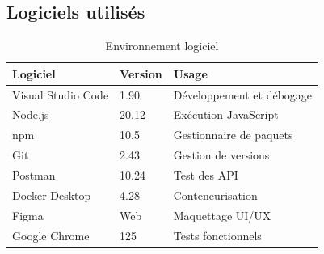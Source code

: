 \documentclass[12pt, a4paper]{report}
\begin{document}
\subsection{Logiciels utilisés}
\begin{table}[H]
\centering
\caption{Environnement logiciel}
\begin{tabular}{|l|l|p{6cm}|}
\hline
\textbf{Logiciel} & \textbf{Version} & \textbf{Usage} \\
\hline
Visual Studio Code & 1.90 & Développement et débogage \\
\hline
Node.js & 20.12 & Exécution JavaScript \\
\hline
npm & 10.5 & Gestionnaire de paquets \\
\hline
Git & 2.43 & Gestion de versions \\
\hline
Postman & 10.24 & Test des API \\
\hline
Docker Desktop & 4.28 & Conteneurisation \\
\hline
Figma & Web & Maquettage UI/UX \\
\hline
Google Chrome & 125 & Tests fonctionnels \\
\hline
\end{tabular}
\end{table}
\end{document}
